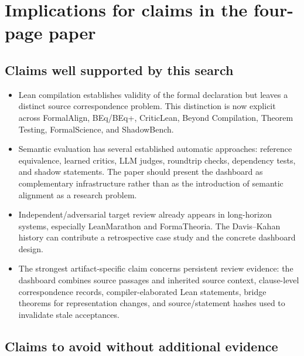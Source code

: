 \documentclass[11pt]{article}
\begin{document}
\section{Implications for claims in the four-page paper}

\subsection{Claims well supported by this search}

\begin{itemize}
  \item Lean compilation establishes validity of the formal declaration but
  leaves a distinct source correspondence problem.  This distinction is now
  explicit across FormalAlign, BEq/BEq+, CriticLean, Beyond Compilation,
  Theorem Testing, FormalScience, and ShadowBench.

  \item Semantic evaluation has several established automatic approaches:
  reference equivalence, learned critics, LLM judges, roundtrip checks,
  dependency tests, and shadow statements.  The paper should present the
  dashboard as complementary infrastructure rather than as the introduction of
  semantic alignment as a research problem.

  \item Independent/adversarial target review already appears in long-horizon
  systems, especially LeanMarathon and FormaTheoria.  The Davis--Kahan history
  can contribute a retrospective case study and the concrete dashboard design.

  \item The strongest artifact-specific claim concerns persistent review
  evidence: the dashboard combines source passages and inherited source
  context, clause-level correspondence records, compiler-elaborated Lean
  statements, bridge theorems for representation changes, and source/statement
  hashes used to invalidate stale acceptances.
\end{itemize}

\subsection{Claims to avoid without additional evidence}
\end{document}
